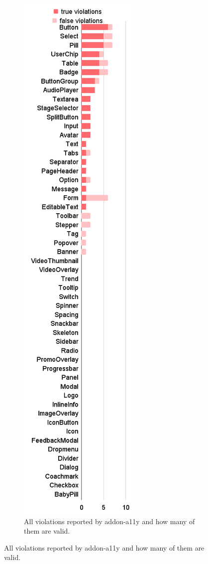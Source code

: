 \documentclass{master_thesis}
\begin{document}
\begin{figure}[H]
	\centering
	\begin{subfigure}{0.24\textwidth}
	\includegraphics[height=0.7\textheight]{img/audit-failed.png}
	\caption{All violations reported by addon-a11y and how many of them are valid.}

\end{subfigure}
\end{figure}
\end{document}
